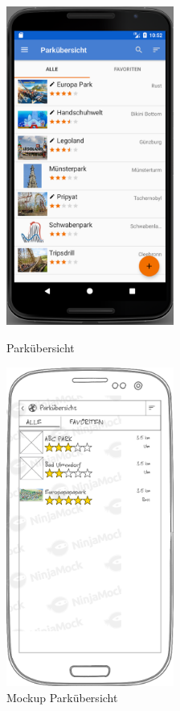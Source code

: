 \begin{figure}[h]
    \centering
    \begin{minipage}{0.49\textwidth}
        \centering
        \includegraphics[width=0.49\textwidth]{img/screenshots/ss_parkuebersicht.png}
        \caption{Parkübersicht}
		\label{figure:implementierungparkuebersicht}
    \end{minipage}
    \begin{minipage}{0.49\textwidth}
        \centering
        \includegraphics[width=0.49\textwidth]{img/mockups/m_parkuebersicht.png}
        \caption{Mockup Parkübersicht}
    \end{minipage}
\end{figure}

